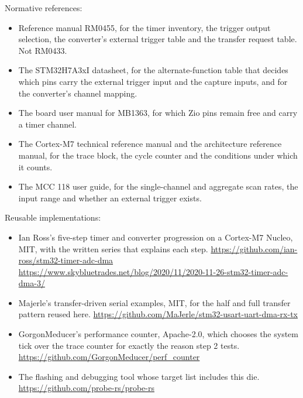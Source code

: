 Normative references:
\begin{itemize}
\item Reference manual RM0455, for the timer inventory, the trigger output
selection, the converter's external trigger table and the transfer request
table. Not RM0433.
\item The STM32H7A3xI datasheet, for the alternate-function table that decides
which pins carry the external trigger input and the capture inputs, and for the
converter's channel mapping.
\item The board user manual for MB1363, for which Zio pins remain free and
carry a timer channel.
\item The Cortex-M7 technical reference manual and the architecture reference
manual, for the trace block, the cycle counter and the conditions under which it
counts.
\item The MCC 118 user guide, for the single-channel and aggregate scan rates,
the input range and whether an external trigger exists.
\end{itemize}

Reusable implementations:
\begin{itemize}
\item Ian Ross's five-step timer and converter progression on a Cortex-M7
Nucleo, MIT, with the written series that explains each step.\newline
\url{https://github.com/ian-ross/stm32-timer-adc-dma}\newline
\url{https://www.skybluetrades.net/blog/2020/11/2020-11-26-stm32-timer-adc-dma-3/}
\item Majerle's transfer-driven serial examples, MIT, for the half and full
transfer pattern reused here.\newline
\url{https://github.com/MaJerle/stm32-usart-uart-dma-rx-tx}
\item GorgonMeducer's performance counter, Apache-2.0, which chooses the system
tick over the trace counter for exactly the reason step 2 tests.\newline
\url{https://github.com/GorgonMeducer/perf_counter}
\item The flashing and debugging tool whose target list includes this die.\newline
\url{https://github.com/probe-rs/probe-rs}
\end{itemize}
